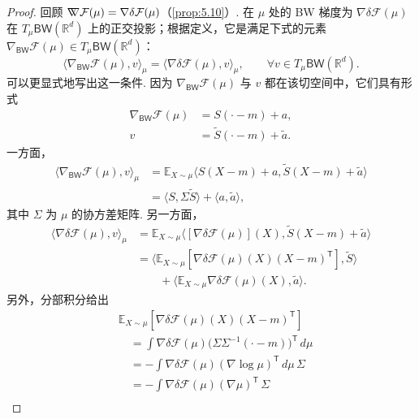 \begin{proof}
回顾 $\nabla\mkern-10mu\nabla\mathcal F(\mu)=\nabla\delta\mathcal F(\mu)$（\autoref{prop:5.10}）. 在 $\mu$ 处的 BW 梯度为 $\nabla\delta\mathcal F(\mu)$ 在 $T_\mu\mathsf{BW}(\mathbb R^d)$ 上的正交投影；根据定义，它是满足下式的元素 $\nabla_{\mathsf{BW}}\mathcal F(\mu)\in T_\mu\mathsf{BW}(\mathbb R^d)$：
\begin{equation}\label{eq:5.11}
\langle\nabla_{\mathsf{BW}}\mathcal F(\mu),v\rangle_\mu
=\langle\nabla\delta\mathcal F(\mu),v\rangle_\mu,
\qquad\forall v\in T_\mu\mathsf{BW}(\mathbb R^d).
\end{equation}
可以更显式地写出这一条件. 因为 $\nabla_{\mathsf{BW}}\mathcal F(\mu)$ 与 $v$ 都在该切空间中，它们具有形式
$$
\begin{aligned}
\nabla_{\mathsf{BW}}\mathcal F(\mu)&=S(\cdot-m)+a,\\
v&=\widetilde S(\cdot-m)+\widetilde a.
\end{aligned}
$$
一方面，
\begin{equation}\label{eq:5.12}
\begin{aligned}
\langle\nabla_{\mathsf{BW}}\mathcal F(\mu),v\rangle_\mu
&=\mathbb E_{X\sim\mu}\langle S(X-m)+a,\widetilde S(X-m)+\widetilde a\rangle\\
&=\langle S,\Sigma\widetilde S\rangle+\langle a,\widetilde a\rangle,
\end{aligned}
\end{equation}
其中 $\Sigma$ 为 $\mu$ 的协方差矩阵. 另一方面，
\begin{align}
\langle\nabla\delta\mathcal F(\mu),v\rangle_\mu
&=\mathbb E_{X\sim\mu}\langle[\nabla\delta\mathcal F(\mu)](X),\widetilde S(X-m)+\widetilde a\rangle\nonumber\\
&=\langle\mathbb E_{X\sim\mu}[\nabla\delta\mathcal F(\mu)(X)(X-m)^{\mathsf T}],\widetilde S\rangle\label{eq:5.13}\\
&\qquad+\langle\mathbb E_{X\sim\mu}\nabla\delta\mathcal F(\mu)(X),\widetilde a\rangle.\label{eq:5.14}
\end{align}
另外，分部积分给出
$$
\begin{aligned}
&\mathbb E_{X\sim\mu}[\nabla\delta\mathcal F(\mu)(X)(X-m)^{\mathsf T}]\\
&\quad=\int\nabla\delta\mathcal F(\mu)\bigl(\Sigma\Sigma^{-1}(\cdot-m)\bigr)^{\mathsf T}\,d\mu\\
&\quad=-\int\nabla\delta\mathcal F(\mu)(\nabla\log\mu)^{\mathsf T}\,d\mu\,\Sigma\\
&\quad=-\int\nabla\delta\mathcal F(\mu)(\nabla\mu)^{\mathsf T}\,\Sigma\\

\end{aligned}$$
\end{proof}

